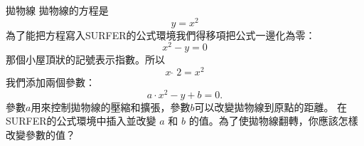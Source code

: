 \begin{surferPage}{拋物線}
拋物線的方程是 \[y=x^2\]
為了能把方程寫入SURFER的公式環境我們得移項把公式一邊化為零：
\[x^2-y=0\]
那個小屋頂狀的記號表示指數。所以
\[ x  \,\hat{\ } \, 2 =x^2\]
我們添加兩個參數：
\[a \cdot x^2-y+b=0.\]
參數$a$用來控制拋物線的壓縮和擴張，參數$b$可以改變拋物線到原點的距離。
\newline
在SURFER的公式環境中插入並改變 $a$ 和 $b$ 的值。為了使拋物線翻轉，你應該怎樣改變參數的值？
\end{surferPage}
